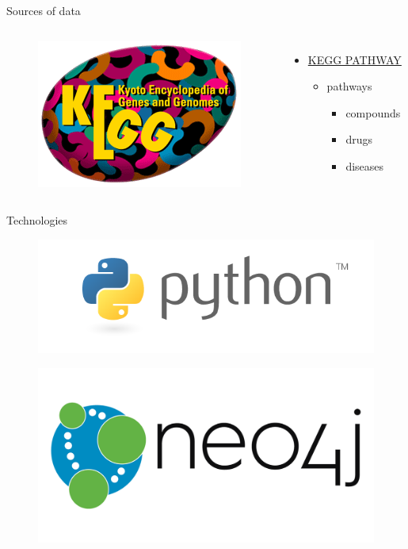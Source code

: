 \documentclass{beamer}
\begin{document}
\begin{frame}{Sources of data}
\begin{columns}[c]
\begin{figure}
    \centering
    \includegraphics[width=0.8\linewidth]{kegg_logo.png}
\end{figure}
\begin{itemize}
    \item \href{https://www.genome.jp/kegg/pathway.html}{KEGG PATHWAY}
    \begin{itemize}
        \item pathways
        \begin{itemize}
            \item compounds
            \item drugs
            \item diseases
        \end{itemize}
    \end{itemize}
\end{itemize}

\end{columns}
\end{frame}

\begin{frame}{Technologies}
    \centering
\begin{figure}
    \includegraphics[width=0.7\linewidth]{python_logo.png}
\end{figure}
\begin{figure}
    \includegraphics[width=0.5\linewidth]{neo4j_logo.png}
\end{figure}
\end{frame}
\end{document}
